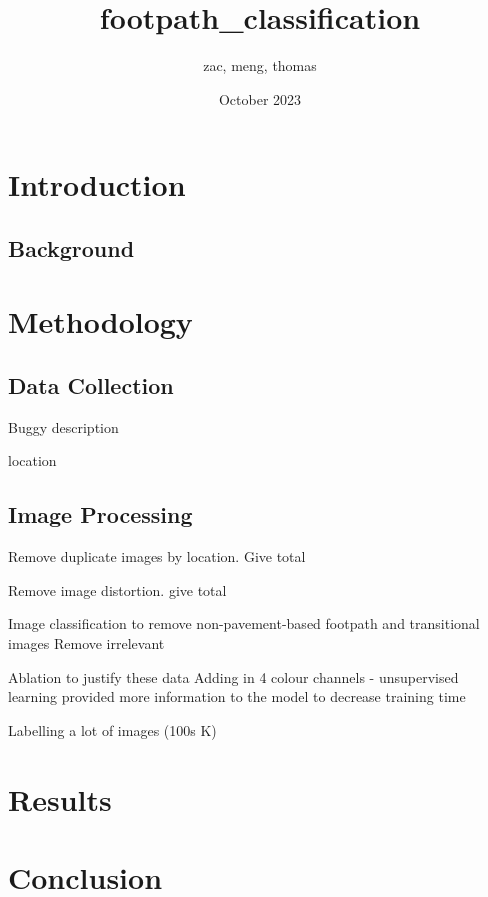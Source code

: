 \documentclass{article}
\title{footpath_classification}
\author{zac, meng, thomas}
\date{October 2023}
\begin{document}
\maketitle

\section{Introduction}


\subsection{Background}


\section{Methodology}

\subsection{Data Collection}

Buggy description

location


\subsection{Image Processing}

Remove duplicate images by location. Give total


Remove image distortion. give total


Image classification to remove non-pavement-based footpath and transitional images
Remove irrelevant 

Ablation to justify these data
Adding in 4 colour channels - unsupervised learning provided more information to the model to decrease training time

Labelling a lot of images (100s K)


\subsection{}


\section{Results}


\section{Conclusion}
\end{document}
